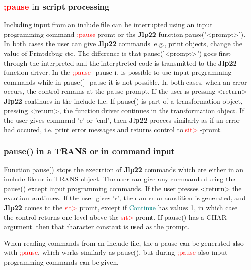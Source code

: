 \subsubsection{\textcolor{Red}{;pause} in script processing}
\label{inpupause}
Including input from an include file can be interrupted using an input programming
command \textcolor{Red}{;pause} promt or the \textbf{Jlp22} function \textcolor{VioletRed}{pause}('<prompt>'). In both cases
the user can give \textbf{Jlp22} commands, e.g., print objects, change the value of Printdebug etc.
The difference is that  \textcolor{VioletRed}{pause}('<prompt>') goes first through the interpreted and the interptreted
code is transmitted to the \textbf{Jlp22} function driver. In the \textcolor{Red}{;pause}- pause it is possible to
use input programming commands while in \textcolor{VioletRed}{pause}()- pause it is not possible. In both cases, when
an error occurs, the control remains at the pause prompt. If the user is pressing
<return> \textbf{Jlp22} continues in the include file. If \textcolor{VioletRed}{pause}() is part of a transformation object,
pressing <return>, the function driver continues in the transformation object.
If the user gives command 'e' or 'end', then \textbf{Jlp22} procees similarly as if an error had occured,
i.e. print error messages and returns control to \textcolor{Red}{sit>} -promt.
\subsubsection{\textcolor{VioletRed}{pause}() in a TRANS or in command input}
\label{pause}
Function \textcolor{VioletRed}{pause}() stops the execution of \textbf{Jlp22} commands which are either in an
include file or in TRANS object. The user can give any commands during the
\textcolor{VioletRed}{pause}() except input programming commands.
If the user presses <return> the excution continues. If the user gives 'e', then
an error condition is generated, and \textbf{Jlp22} comes to the \textcolor{Red}{sit>} promt, except
if \textcolor{teal}{Continue} has values 1, in which case the control returns one level above
the \textcolor{Red}{sit>} promt.
If \textcolor{VioletRed}{pause}()  has a CHAR argument, then that character constant is used as
the prompt.
\begin{note}
When reading commands from an include file, the a pause can be generated also
with \textcolor{Red}{;pause}, which works similarly as \textcolor{VioletRed}{pause}(), but during \textcolor{Red}{;pause} also input programming
commands can be given.
\end{note}
